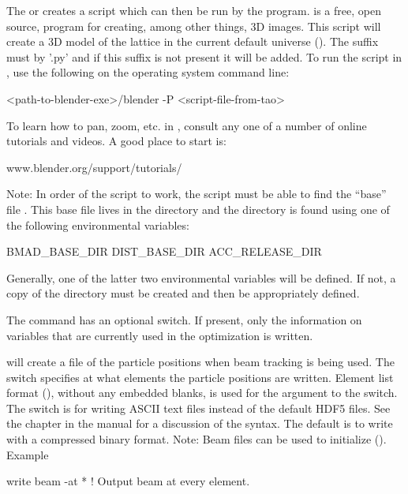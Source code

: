 {{{{{{{{{The  or  creates a script which can then be run by
the  program\cite{b:blender}.   is a free, open source, program
for creating, among other things, 3D images. This script will create a 3D model of the
lattice in the current default universe (). The suffix must by '.py' and
if this suffix is not present it will be added. To run the script in , use the
following on the operating system command line:
\begin{example}
  <path-to-blender-exe>/blender -P <script-file-from-tao>
\end{example}
To learn how to pan, zoom, etc. in , consult any one of a number of online
tutorials and videos. A good place to start is:
\begin{example}
  www.blender.org/support/tutorials/  
\end{example}
Note: In order of the script to work, the script must be able to find the ``base'' file
. This base file lives in the  directory and the
 directory is found using one of the following environmental variables:
\begin{example}
  BMAD_BASE_DIR
  DIST_BASE_DIR
  ACC_RELEASE_DIR
\end{example}
Generally, one of the latter two environmental variables will be defined.  If not, a copy
of the \bmad directory must be created and then  be appropriately
defined.

The  command has an optional  switch.  If present,
only the information on variables that are currently used in the optimization is written.

 will create a file of the particle positions when beam tracking is being used. The
 switch specifies at what elements the particle positions are written. Element list format
(), without any embedded blanks, is used for the 
argument to the  switch. The  switch is for writing ASCII text files instead of
the default HDF5 files. See the  chapter in the \bmad manual for a
discussion of the syntax. The default is to write with a compressed binary format. Note: Beam files
can be used to initialize \tao (). Example
\begin{example}
  write beam -at *   ! Output beam at every element.
\end{example}

}}}}}}}}}
